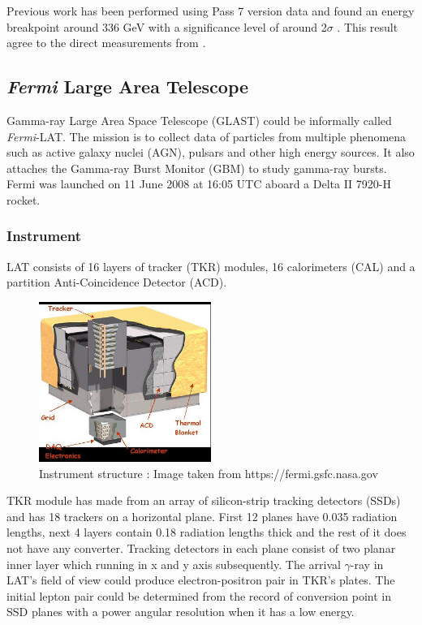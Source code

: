 \par Previous work has been performed using Pass 7 version data \cite{FermiPass7} and found an energy breakpoint around 336 GeV with a significance level of around 2$\sigma$ \cite{previouswork}. This result agree to the direct measurements from \cite{AMS-02,PAMELA}.


\subsection{\textit{Fermi} Large Area Telescope}

Gamma-ray Large Area Space Telescope (GLAST) could be informally called \textit{Fermi}-LAT. The mission is to collect data of particles from multiple phenomena such as active galaxy nuclei (AGN), pulsars and other high energy sources.
It also attaches the Gamma-ray Burst Monitor (GBM) to study gamma-ray bursts. Fermi was launched on 11 June 2008 at 16:05 UTC aboard a Delta II 7920-H rocket.


\subsubsection*{Instrument}
LAT consists of 16 layers of tracker (TKR) modules, 16 calorimeters (CAL) and a partition Anti-Coincidence Detector (ACD). 

\begin{figure}[h!]
  \centering
    \includegraphics[width=0.5\textwidth]{img/LATStructure}
    \caption{Instrument structure : Image taken from https://fermi.gsfc.nasa.gov}
\end{figure}

\par TKR module has made from an array of silicon-strip tracking detectors (SSDs) and has 18 trackers on a horizontal plane. First 12 planes have 0.035 radiation lengths, next 4 layers contain 0.18 radiation lengths thick and the rest of it does not have any converter.
Tracking detectors in each plane consist of two planar inner layer which running in x and y axis subsequently. The arrival $\gamma$-ray in LAT's field of view could produce electron-positron pair in TKR's plates.
The initial lepton pair could be determined from the record of conversion point in SSD planes with a power angular resolution when it has a low energy.

